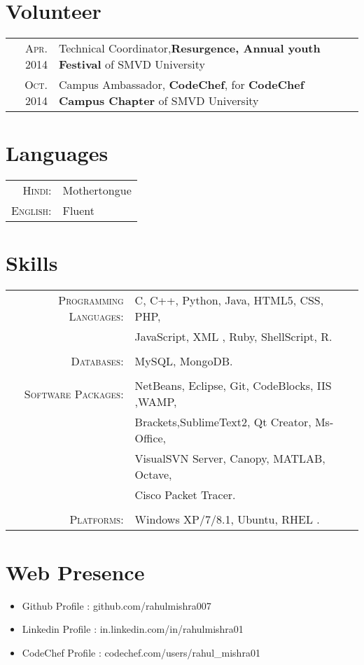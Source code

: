 \documentclass[a4paper,10pt]{article}
\begin{document}
\section{Volunteer}
\begin{tabular}{rl}
 \textsc{Apr.} 2014 & Technical Coordinator,\normalsize\textbf{Resurgence, Annual youth Festival} of SMVD University\\
 \textsc{Oct.} 2014 & Campus Ambassador,\normalsize\textbf{   CodeChef}, for \normalsize\textbf{CodeChef Campus Chapter} of SMVD University\\
\end{tabular}


\section{Languages}
\begin{tabular}{rl}
 \textsc{Hindi:}&Mothertongue\\
\textsc{English:}&Fluent\\
\end{tabular}

\section{Skills }
\begin{tabular}{rl}
 \textsc{Programming Languages:}& C, C++, Python, Java, HTML5, CSS, PHP,\\ & JavaScript, XML , Ruby, ShellScript, R.
 \\ &\\
  \textsc{Databases:}&  MySQL, MongoDB.
 \\ &\\
\textsc{Software Packages:}& NetBeans, Eclipse, Git, CodeBlocks, IIS ,WAMP, \\& Brackets,SublimeText2, Qt Creator, Ms-Office, \\ & VisualSVN Server, Canopy, MATLAB, Octave,\\ & Cisco Packet Tracer.\\&\\ 
\textsc{Platforms:}& Windows XP/7/8.1, Ubuntu, RHEL .\\
\end{tabular}

\section{Web Presence }
\begin{itemize}
  \item Github Profile : github.com/rahulmishra007
  \item Linkedin Profile : in.linkedin.com/in/rahulmishra01
  \item CodeChef Profile : codechef.com/users/rahul\_mishra01
\end{itemize}
\end{document}

